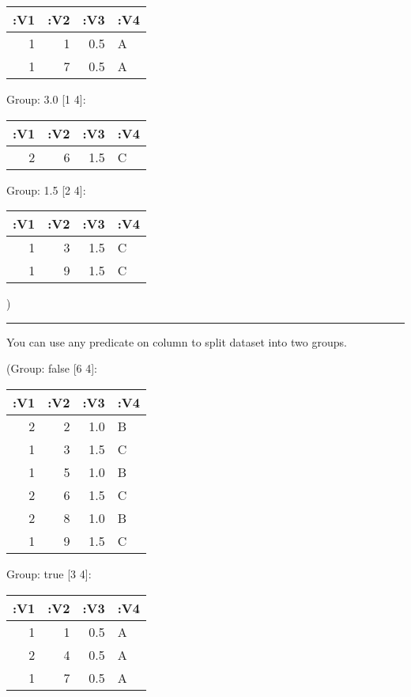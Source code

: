 \documentclass[]{article}
\newenvironment{Shaded}{\begin{snugshade}}{\end{snugshade}}
\newcommand{\KeywordTok}[1]{\textcolor[rgb]{0.13,0.29,0.53}{\textbf{#1}}}
\newcommand{\FloatTok}[1]{\textcolor[rgb]{0.00,0.00,0.81}{#1}}
\newcommand{\VariableTok}[1]{\textcolor[rgb]{0.00,0.00,0.00}{#1}}
\newcommand{\AttributeTok}[1]{\textcolor[rgb]{0.77,0.63,0.00}{#1}}
\newcommand{\NormalTok}[1]{#1}
\begin{document}
\begin{longtable}[]{@{}rrrl@{}}
\toprule
:V1 & :V2 & :V3 & :V4\tabularnewline
\midrule
\endhead
1 & 1 & 0.5 & A\tabularnewline
1 & 7 & 0.5 & A\tabularnewline
\bottomrule
\end{longtable}

Group: 3.0 {[}1 4{]}:

\begin{longtable}[]{@{}rrrl@{}}
\toprule
:V1 & :V2 & :V3 & :V4\tabularnewline
\midrule
\endhead
2 & 6 & 1.5 & C\tabularnewline
\bottomrule
\end{longtable}

Group: 1.5 {[}2 4{]}:

\begin{longtable}[]{@{}rrrl@{}}
\toprule
:V1 & :V2 & :V3 & :V4\tabularnewline
\midrule
\endhead
1 & 3 & 1.5 & C\tabularnewline
1 & 9 & 1.5 & C\tabularnewline
\bottomrule
\end{longtable}

)

\begin{center}\rule{0.5\linewidth}{0.5pt}\end{center}

You can use any predicate on column to split dataset into two groups.

\begin{Shaded}
\end{Shaded}

(Group: false {[}6 4{]}:

\begin{longtable}[]{@{}rrrl@{}}
\toprule
:V1 & :V2 & :V3 & :V4\tabularnewline
\midrule
\endhead
2 & 2 & 1.0 & B\tabularnewline
1 & 3 & 1.5 & C\tabularnewline
1 & 5 & 1.0 & B\tabularnewline
2 & 6 & 1.5 & C\tabularnewline
2 & 8 & 1.0 & B\tabularnewline
1 & 9 & 1.5 & C\tabularnewline
\bottomrule
\end{longtable}

Group: true {[}3 4{]}:

\begin{longtable}[]{@{}rrrl@{}}
\toprule
:V1 & :V2 & :V3 & :V4\tabularnewline
\midrule
\endhead
1 & 1 & 0.5 & A\tabularnewline
2 & 4 & 0.5 & A\tabularnewline
1 & 7 & 0.5 & A\tabularnewline
\bottomrule
\end{longtable}
\end{document}

